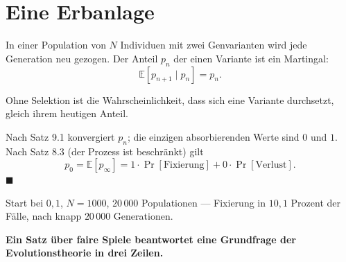 \section{Eine Erbanlage}

\begin{merksatz}
In einer Population von $N$ Individuen mit zwei Genvarianten wird jede Generation neu gezogen. Der Anteil $p_n$ der einen Variante ist ein Martingal:
\[ \mathbb{E}[p_{n+1} \mid p_n] = p_n . \]

Ohne Selektion ist die Wahrscheinlichkeit, dass sich eine Variante durchsetzt, gleich ihrem heutigen Anteil.

Nach Satz 9.1 konvergiert $p_n$; die einzigen absorbierenden Werte sind $0$ und $1$. Nach Satz 8.3 (der Prozess ist beschränkt) gilt
\[ p_0 = \mathbb{E}[p_\infty] = 1\cdot\Pr[\text{Fixierung}] + 0\cdot\Pr[\text{Verlust}] . \]
$\blacksquare$

 Start bei $0{,}1$, $N = 1000$, $20\,000$ Populationen --- Fixierung in $10{,}1$ Prozent der Fälle, nach knapp $20\,000$ Generationen.

\begin{center}
\begin{minipage}{0.9\textwidth}
\textbf{Ein Satz über faire Spiele beantwortet eine Grundfrage der Evolutionstheorie in drei Zeilen.}
\end{minipage}
\end{center}
\end{merksatz}

